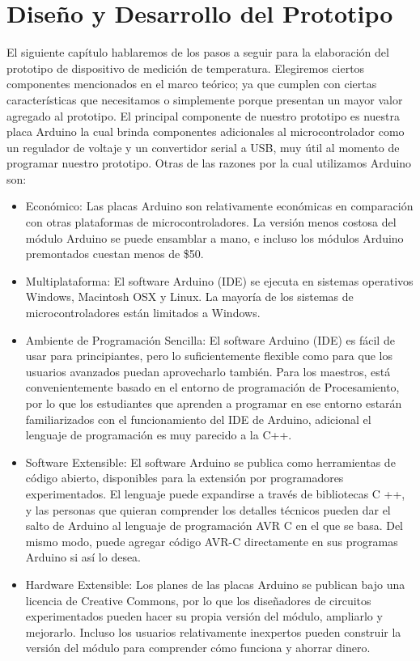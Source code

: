 \chapter{Diseño y Desarrollo del Prototipo}
\par 
El siguiente capítulo hablaremos de los pasos a seguir para la elaboración del prototipo de dispositivo de medición de temperatura. Elegiremos ciertos componentes mencionados en el marco teórico; ya que cumplen con ciertas características que necesitamos o simplemente porque presentan un mayor valor agregado al prototipo. El principal componente de nuestro prototipo es nuestra placa Arduino la cual brinda componentes adicionales al microcontrolador como un regulador de voltaje y un convertidor serial a USB, muy útil al momento de programar nuestro prototipo. Otras de las razones por la cual utilizamos Arduino son\cite{arduino-intro}:

\begin{itemize}
	\item Económico: 
	Las placas Arduino son relativamente económicas en comparación con otras plataformas de microcontroladores. La versión menos costosa del módulo Arduino se puede ensamblar a mano, e incluso los módulos Arduino premontados cuestan menos de \$50.
	
	\item Multiplataforma: El software Arduino (IDE) se ejecuta en sistemas operativos Windows, Macintosh OSX y Linux. La mayoría de los sistemas de microcontroladores están limitados a Windows.
	
	\item Ambiente de Programación Sencilla: El software Arduino (IDE) es fácil de usar para principiantes, pero lo suficientemente flexible como para que los usuarios avanzados puedan aprovecharlo también. Para los maestros, está convenientemente basado en el entorno de programación de Procesamiento, por lo que los estudiantes que aprenden a programar en ese entorno estarán familiarizados con el funcionamiento del IDE de Arduino, adicional el lenguaje de programación es muy parecido a la C++.
	
	\clearpage
	
	\item Software Extensible: El software Arduino se publica como herramientas de código abierto, disponibles para la extensión por programadores experimentados. El lenguaje puede expandirse a través de bibliotecas C ++, y las personas que quieran comprender los detalles técnicos pueden dar el salto de Arduino al lenguaje de programación AVR C en el que se basa. Del mismo modo, puede agregar código AVR-C directamente en sus programas Arduino si así lo desea.
	
	\item Hardware Extensible: 
	Los planes de las placas Arduino se publican bajo una licencia de Creative Commons, por lo que los diseñadores de circuitos experimentados pueden hacer su propia versión del módulo, ampliarlo y mejorarlo. Incluso los usuarios relativamente inexpertos pueden construir la versión del módulo para comprender cómo funciona y ahorrar dinero.
\end{itemize}

